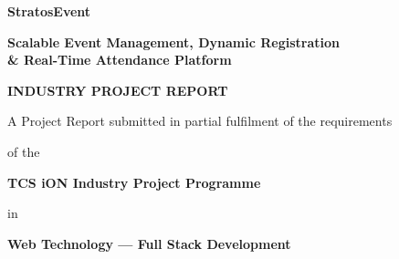 \documentclass[11pt,a4paper]{article}
\begin{document}
\setcounter{page}{1}
\thispagestyle{fancy}


\vspace*{0.72in}

\begin{center}

  {\color{TitleBlue}\bfseries
   \fontsize{28}{34}\selectfont
   StratosEvent\par}

  \vspace{0.04in}

  {\color{TitleBlue}\bfseries
   \fontsize{19}{25}\selectfont
   Scalable Event Management, Dynamic Registration\\
   \& Real-Time Attendance Platform\par}

  \vspace{0.14in}

  {\color{TCSBlue}\bfseries
   \fontsize{15}{19}\selectfont
   INDUSTRY PROJECT REPORT\par}

  \vspace{0.10in}

  {\fontsize{11}{15}\selectfont
    A Project Report submitted in partial fulfilment of the requirements\par
    of the\par
    \textbf{TCS iON Industry Project Programme}\par
    in\par
    \textbf{Web Technology --- Full Stack Development}\par
  }

\end{center}

\vspace{0.30in}

\begingroup

\fontsize{10}{12}\selectfont
\renewcommand{\arraystretch}{1.35}
\setlength{\tabcolsep}{7pt}
\end{document}
